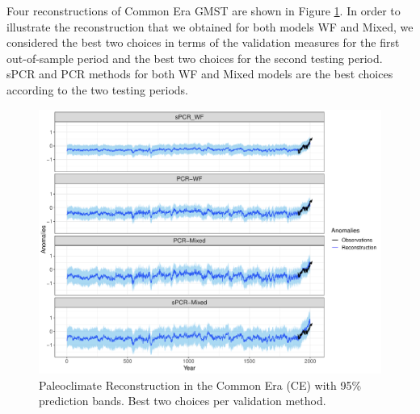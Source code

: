 \documentclass[12pt]{amsart}
\theoremstyle{plain}
\theoremstyle{definition}
\theoremstyle{remark}
\newcommand{\lb}[1]{\color{MidnightBlue}\textbf{[LB: #1]}\normalcolor}
\newcommand{\jeg}[1]{\color{ProcessBlue}\textbf{[JEG: #1]}\normalcolor}
\begin{document}
 Four reconstructions of Common Era GMST
are shown in Figure \ref{fig:paleoCE1}.
In order to illustrate the reconstruction that we obtained for both models WF and Mixed, we considered the best two choices in terms of the validation measures for the
first out-of-sample period  and the best two choices for the second testing
period. sPCR and PCR methods for both WF and Mixed models are the best choices
according to the two testing periods.

\begin{figure}[h!]
  \centering
  \includegraphics[scale=0.40]{RecCE_Final}
  \caption{Paleoclimate Reconstruction in the Common Era (CE) with 95\%
    prediction bands. Best two choices per validation method.}
  \label{fig:paleoCE1}
\end{figure}

\end{document}
